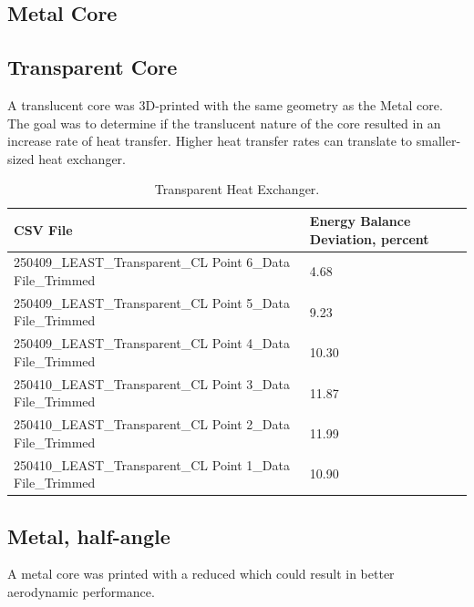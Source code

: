 \documentclass[12pt]{article}
\begin{document}
\subsection{Metal Core}

\subsection{Transparent Core}
A translucent core was 3D-printed with the same geometry as the Metal core. The goal was to determine if the translucent nature of the core resulted in an increase rate of heat transfer. Higher heat transfer rates can translate to smaller-sized heat exchanger.

\begin{table}[h]
	\centering
	\caption{Transparent Heat Exchanger.}
	\label{tab:resultsTransparent}
	\begin{tabular}{|l|l|}
		\hline
		\textbf{CSV File} & \textbf{Energy Balance Deviation, percent} \\
		\hline
			250409\_LEAST\_Transparent\_CL Point 6\_Data File\_Trimmed & 4.68  \\
			250409\_LEAST\_Transparent\_CL Point 5\_Data File\_Trimmed & 9.23  \\
			250409\_LEAST\_Transparent\_CL Point 4\_Data File\_Trimmed & 10.30  \\
			250410\_LEAST\_Transparent\_CL Point 3\_Data File\_Trimmed & 11.87  \\
			250410\_LEAST\_Transparent\_CL Point 2\_Data File\_Trimmed & 11.99  \\
			250410\_LEAST\_Transparent\_CL Point 1\_Data File\_Trimmed & 10.90  \\
		\hline
	\end{tabular}
\end{table}



\subsection{Metal, half-angle} 
A metal core was printed with a reduced which could result in better aerodynamic performance.
\end{document}
